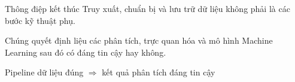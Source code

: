 \documentclass[aspectratio=169,11pt]{beamer}
\newcommand{\smallgap}{\vspace{0.4em}}
\begin{document}
\begin{frame}{Thông điệp kết thúc}
Truy xuất, chuẩn bị và lưu trữ dữ liệu không phải là các bước kỹ thuật phụ.

\smallgap
Chúng quyết định liệu các phân tích, trực quan hóa và mô hình Machine Learning sau đó có đáng tin cậy hay không.

\smallgap
\begin{center}
\Large Pipeline dữ liệu đúng $\Rightarrow$ kết quả phân tích đáng tin cậy
\end{center}
\end{frame}
\end{document}
